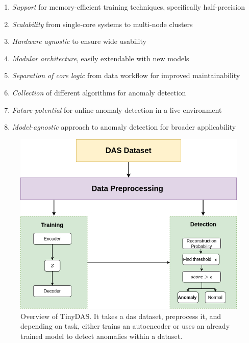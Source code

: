 \clearpage

\begin{enumerate}
    \item \textit{Support} for memory-efficient training techniques, specifically half-precision
    \item \textit{Scalability} from single-core systems to multi-node clusters
    \item \textit{Hardware agnostic} to ensure wide usability
    \item \textit{Modular architecture}, easily extendable with new models
    \item \textit{Separation of core logic} from data workflow for improved maintainability
    \item \textit{Collection} of different algorithms for anomaly detection
    \item \textit{Future potential} for online anomaly detection in a live environment
    \item \textit{Model-agnostic} approach to anomaly detection for broader applicability
\end{enumerate}

\begin{figure}[!h]
    \centering
    \includegraphics[scale=0.5]{figures/methodflow.png}
    \caption{Overview of TinyDAS. It takes a \acrshort{das} dataset, preprocess it, and depending on task, either trains an autoencoder or uses an already trained model to detect anomalies within a dataset.}
    \label{fig:dataflow}
\end{figure}

